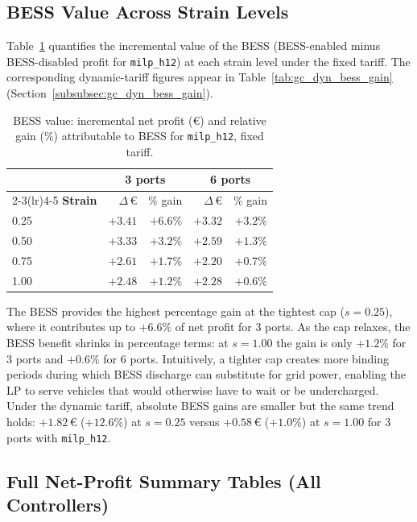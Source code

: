 \subsection{BESS Value Across Strain Levels}
\label{subsec:gc_bess_value}

Table~\ref{tab:gc_bess_gain} quantifies the incremental value of the BESS
(BESS-enabled minus BESS-disabled profit for \texttt{milp\_h12}) at
each strain level under the fixed tariff.  The corresponding dynamic-tariff
figures appear in Table~\ref{tab:gc_dyn_bess_gain}
(Section~\ref{subsubsec:gc_dyn_bess_gain}).

\begin{table}[!htb]
\centering
\caption{BESS value: incremental net profit (€) and relative gain (\%)
         attributable to BESS for \texttt{milp\_h12}, fixed tariff.}
\label{tab:gc_bess_gain}
\begin{tabular}{l rr rr}
\toprule
 & \multicolumn{2}{c}{\textbf{3 ports}} & \multicolumn{2}{c}{\textbf{6 ports}} \\
\cmidrule(lr){2-3}\cmidrule(lr){4-5}
\textbf{Strain} & $\Delta$\,€ & \% gain & $\Delta$\,€ & \% gain \\
\midrule
0.25 & $+3.41$ & $+6.6\%$ & $+3.32$ & $+3.2\%$ \\
0.50 & $+3.33$ & $+3.2\%$ & $+2.59$ & $+1.3\%$ \\
0.75 & $+2.61$ & $+1.7\%$ & $+2.20$ & $+0.7\%$ \\
1.00 & $+2.48$ & $+1.2\%$ & $+2.28$ & $+0.6\%$ \\
\bottomrule
\end{tabular}
\end{table}

The BESS provides the highest percentage gain at the tightest cap ($s=0.25$),
where it contributes up to $+6.6\%$ of net profit for 3 ports.  As the cap
relaxes, the BESS benefit shrinks in percentage terms: at $s=1.00$ the gain
is only $+1.2\%$ for 3 ports and $+0.6\%$ for 6 ports.  Intuitively, a
tighter cap creates more binding periods during which BESS discharge can
substitute for grid power, enabling the LP to serve vehicles that would
otherwise have to wait or be undercharged.  Under the dynamic tariff,
absolute BESS gains are smaller but the same trend holds:
$+1.82$\,€ ($+12.6\%$) at $s=0.25$ versus $+0.58$\,€ ($+1.0\%$) at
$s=1.00$ for 3 ports with \texttt{milp\_h12}.

\subsection{Full Net-Profit Summary Tables (All Controllers)}
\label{subsec:gc_full_tables}

